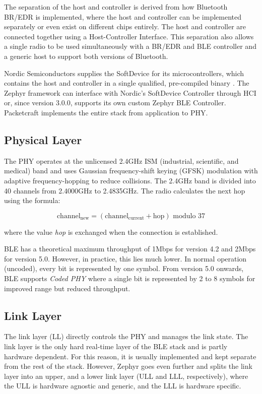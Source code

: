 The separation of the host and controller is derived from how Bluetooth BR/EDR is implemented, where the host and controller can be implemented separately or even exist on different chips entirely. The host and controller are connected together using a Host-Controller Interface. This separation also allows a single radio to be used simultaneously with a BR/EDR and BLE controller and a generic host to support both versions of Bluetooth.

Nordic Semiconductors supplies the SoftDevice for its microcontrollers, which contains the host and controller in a single qualified, pre-compiled binary \cite{nordic_softdevices}. The Zephyr framework can interface with Nordic's SoftDevice Controller through HCI or, since version 3.0.0, supports its own custom Zephyr BLE Controller. Packetcraft implements the entire stack from application to PHY.

\subsection{Physical Layer}
\label{sec:phy_layer}
The PHY operates at the unlicensed 2.4GHz ISM (industrial, scientific, and medical) band and uses Gaussian frequency-shift keying (GFSK) modulation with adaptive frequency-hopping to reduce collisions. The 2.4GHz band is divided into 40 channels from 2.4000GHz to 2.4835GHz. The radio calculates the next hop using the formula:

\[\text{channel}_{\text{new}} = (\text{channel}_{\text{current}} + \text{hop}) \text{ modulo } 37\]
    
where the value \textit{hop} is exchanged when the connection is established.

BLE has a theoretical maximum throughput of 1Mbps for version 4.2 and 2Mbps for version 5.0. However, in practice, this lies much lower. In normal operation (uncoded), every bit is represented by one symbol. From version 5.0 onwards, BLE supports \textit{Coded PHY} where a single bit is represented by 2 to 8 symbols for improved range but reduced throughput.

\subsection{Link Layer} 
The link layer (LL) directly controls the PHY and manages the link state. The link layer is the only hard real-time layer of the BLE stack and is partly hardware dependent. For this reason, it is usually implemented and kept separate from the rest of the stack. However, Zephyr goes even further and splits the link layer into an upper, and a lower link layer (ULL and LLL, respectively), where the ULL is hardware agnostic and generic, and the LLL is hardware specific.

